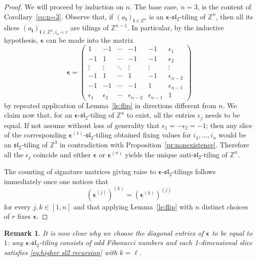 \documentclass{amsart}
\newtheorem{remark}[theorem]{Remark}
\newcommand{\bepsilon}{\boldsymbol{\epsilon}}
\newcommand{\bi}{\boldsymbol{i}}
\newcommand{\fsl}{\mathfrak{sl}}
\newcommand{\ZZ}{\mathbb{Z}}
\begin{document}
  \begin{proof}
    We will proceed by induction on $n$. 
    The base case, $n=3$, is the content of Corollary~\ref{co:n=3}.
    Observe that, if $(a_{\bi})_{\bi\in\ZZ^n}$ is an $\bepsilon$-$\fsl_2$-tiling of $\ZZ^n$, then all its slices $(a_{\bi})_{\bi\in\ZZ^n,i_n=r}$ are tilings of $\ZZ^{n-1}$.
    In particular, by the inductive hypothesis, $\bepsilon$ can be made into the matrix
    \[
      \bepsilon = 
      \left(
        \begin{array}{cccccc}
          1          & -1         & \cdots & -1             & -1             & \epsilon_1     \\
          -1         & 1          & \cdots & -1             & -1             & \epsilon_2     \\
          \vdots     & \vdots     & \ddots & \vdots         & \vdots         & \vdots          \\
          -1         & 1          & \cdots & 1              & -1             & \epsilon_{n-2} \\
          -1         & -1         & \cdots & -1             & 1              & \epsilon_{n-1} \\
          \epsilon_1 & \epsilon_2 & \cdots & \epsilon_{n-2} & \epsilon_{n-1} & 1
        \end{array}
      \right)
    \]
    by repeated application of Lemma~\ref{le:flip} in directions different from $n$.
    We claim now that, for an $\bepsilon$-$\fsl_2$-tiling of $\ZZ^n$ to exist, all the entries $\epsilon_j$ needs to be equal. 
    If not assume without loss of generality that $\epsilon_1 = -\epsilon_2 = -1$; then any slice of the corresponding $\bepsilon^{(1)}$-$\fsl_2$-tiling obtained fixing values for $i_4,\dots,i_n$ would be an $\fsl_2$-tiling of $\ZZ^3$ in contradiction with Proposition~\ref{pr:nonexistence}.
    Therefore all the $\epsilon_j$ coincide and either $\bepsilon$ or $\bepsilon^{(n)}$ yields the unique anti-$\fsl_2$-tiling of $\ZZ^n$.

    The counting of signature matrices giving raise to $\bepsilon$-$\fsl_2$-tilings follows immediately once one notices that 
    \[
      \left(\bepsilon^{(j)}\right)^{(k)}=\left(\bepsilon^{(k)}\right)^{(j)}
    \]
    for every $j,k\in[1,n]$ and that applying Lemma~\ref{le:flip} with $n$ distinct choices of $r$ fixes $\bepsilon$.
  \end{proof}
  
  \begin{remark}
    It is now clear why we choose the diagonal entries of $\bepsilon$ to be equal to $1$: any $\bepsilon$-$\fsl_2$-tiling consists of odd Fibonacci numbers and each 1-dimensional slice satisfies \eqref{eq:higher sl2 recursion} with $k=\ell$.
  \end{remark}
\end{document}
